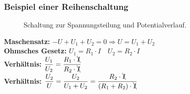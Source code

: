 \subsubsection{Beispiel einer Reihenschaltung}
\begin{figure}[H]
\quad
{}
\centering
\caption{Schaltung zur Spannungsteilung und Potentialverlauf.}
\label{fig_IIIm}
\end{figure}
\textbf{Maschensatz:} $-U+U_1+U_2=0\Longrightarrow U=U_1+U_2$\\
\textbf{Ohmsches Gesetz:} $U_1=R_1\cdot I\quad U_2=R_2\cdot I$\\
\textbf{Verhältnis:} $\dfrac{U_1}{U_2}=\dfrac{R_1\cdot \bcancel{I}}{R_2\cdot \bcancel{I}}$\\
\textbf{Verhältnis:} $\dfrac{U_2}{U}=\dfrac{U_2}{U_1+U_2}=\dfrac{R_2\cdot \bcancel{I}}{\left(R_1+R_2\right)\cdot \bcancel{I}}$
